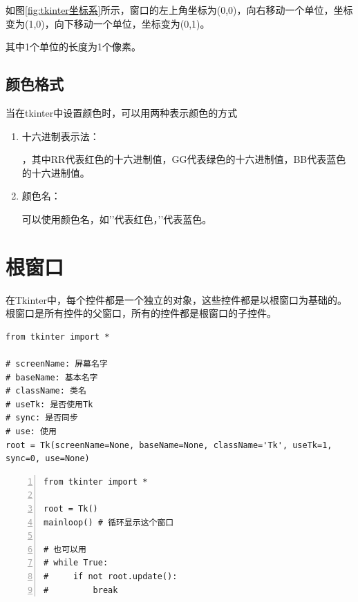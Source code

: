 如图\ref{fig:tkinter坐标系}所示，窗口的左上角坐标为(0,0)，向右移动一个单位，坐标变为(1,0)，向下移动一个单位，坐标变为(0,1)。

其中1个单位的长度为1个像素。

\subsection{颜色格式}
当在tkinter中设置颜色时，可以用两种表示颜色的方式
\begin{enumerate}[label=\arabic*)]
    \item 十六进制表示法：
    
    ，其中RR代表红色的十六进制值，GG代表绿色的十六进制值，BB代表蓝色的十六进制值。
    \item 颜色名：
    
    可以使用颜色名，如''代表红色，''代表蓝色。
\end{enumerate}


\section{根窗口}
在Tkinter中，每个控件都是一个独立的对象，这些控件都是以根窗口为基础的。
根窗口是所有控件的父窗口，所有的控件都是根窗口的子控件。
\begin{lstlisting}[style=demostyle,numbers=none]
from tkinter import *

# screenName: 屏幕名字
# baseName: 基本名字
# className: 类名
# useTk: 是否使用Tk
# sync: 是否同步
# use: 使用
root = Tk(screenName=None, baseName=None, className='Tk', useTk=1, sync=0, use=None)
\end{lstlisting}

\begin{lstlisting}[style=pythonstyle,numbers=left]
from tkinter import *
 
root = Tk()
mainloop() # 循环显示这个窗口

# 也可以用
# while True:
#     if not root.update():
#         break
\end{lstlisting}

